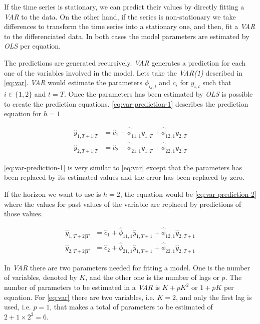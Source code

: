 If the time series is stationary, we can predict their values by
directly fitting a \textit{VAR} to the data. On the other hand, if the
series is non-stationary we take differences to transform the time
series into a stationary one, and then, fit a \textit{VAR} to the
differenciated data. In both cases the model parameters are estimated
by \textit{OLS} per equation.

The predictions are generated recursively. \textit{VAR} generates a
prediction for each one of the variables involved in the model. Lets
take the \textit{VAR(1)} described in \autoref{eq:var}. \textit{VAR}
would estimate the parameters $\phi_{ij,l}$ and $c_i$ for $y_{i,t}$
such that $i \in \{1,2\}$ and $t = T$. Once the parameters has been
estimated by \textit{OLS} is possible to create the prediction
equations. \autoref{eq:var-prediction-1} describes the prediction
equation for $h=1$

\begin{equation}
  \begin{aligned}
    \label{eq:var-prediction-1}
    \hat{y}_{1,T+1|T} & = \hat{c}_1 + \hat{\phi}_{11,1} y_{1,T} +
    \hat{\phi}_{12,1} y_{2,T} \\ 
    \hat{y}_{2,T+1|T} & = \hat{c}_2 + \hat{\phi}_{21,1} y_{1,T} +
    \hat{\phi}_{22,1} y_{2,T}
  \end{aligned}
\end{equation}

\autoref{eq:var-prediction-1} is very similar to \autoref{eq:var}
except that the parameters has been replaced by its estimated values
and the error has been replaced by zero.

If the horizon we want to use is $h = 2$, the equation would be
\autoref{eq:var-prediction-2} where the values for past values of the
variable are replaced by predictions of those values.

\begin{equation}
  \begin{aligned}
    \label{eq:var-prediction-2}
    \hat{y}_{1,T+2|T} & = \hat{c}_1 + \hat{\phi}_{11,1} \hat{y}_{1,T+1} +
    \hat{\phi}_{12,1} \hat{y}_{2,T+1} \\ 
    \hat{y}_{2,T+2|T} & = \hat{c}_2 + \hat{\phi}_{21,1} \hat{y}_{1,T+1} +
    \hat{\phi}_{22,1} \hat{y}_{2,T+1}
  \end{aligned}
\end{equation}

In \textit{VAR} there are two parameters needed for fitting a model.
One is the number of variables, denoted by $K$, and the other one is
the number of lags or $p$. The number of parameters to be estimated in
a \textit{VAR} is $K + p K^2$ or $1 + p K$ per equation. For
\autoref{eq:var} there are two variables, i.e. $K=2$, and only the
first lag is used, i.e. $p=1$, that makes a total of parameters to be
estimated of $2 + 1 \times 2^2 = 6$.


